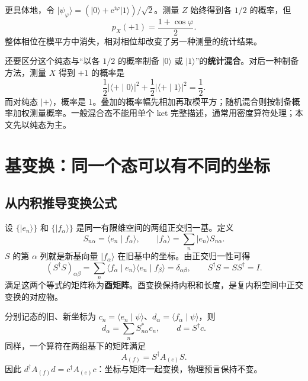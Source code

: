 \documentclass[a4paper,11pt]{article}
\numberwithin{equation}{section}
\newcommand{\ii}{\mathrm{i}}
\newcommand{\ee}{\mathrm{e}}
\newcommand{\ket}[1]{\lvert #1\rangle}
\newcommand{\braket}[2]{\langle #1\mid #2\rangle}
\newcommand{\abs}[1]{\lvert #1\rvert}
\begin{document}
更具体地，令 $\ket{\psi_\varphi}=(\ket{0}+\ee^{\ii\varphi}\ket{1})/\sqrt2$。测量 $Z$ 始终得到各 $1/2$ 的概率，但
\[
  p_X(+1)=\frac{1+\cos\varphi}{2}.
\]
整体相位在模平方中消失，相对相位却改变了另一种测量的统计结果。

还要区分这个纯态与“以各 $1/2$ 的概率制备 $\ket{0}$ 或 $\ket{1}$”的\textbf{统计混合}。对后一种制备方法，测量 $X$ 得到 $+1$ 的概率是
\[
  \frac12\abs{\braket{+}{0}}^2+
  \frac12\abs{\braket{+}{1}}^2=\frac12.
\]
而对纯态 $\ket{+}$，概率是 $1$。叠加的概率幅先相加再取模平方；随机混合则按制备概率加权测量概率。一般混合态不能用单个 ket 完整描述，通常用密度算符处理；本文先以纯态为主。

\section{基变换：同一个态可以有不同的坐标}
\subsection{从内积推导变换公式}
设 $\{\ket{e_n}\}$ 和 $\{\ket{f_\alpha}\}$ 是同一有限维空间的两组正交归一基。定义
\begin{equation}
  S_{n\alpha}=\braket{e_n}{f_\alpha},\qquad
  \ket{f_\alpha}=\sum_n\ket{e_n}S_{n\alpha}.
\end{equation}
$S$ 的第 $\alpha$ 列就是新基向量 $\ket{f_\alpha}$ 在旧基中的坐标。由正交归一性可得
\begin{equation}
  (S^\dagger S)_{\alpha\beta}
  =\sum_n\braket{f_\alpha}{e_n}\braket{e_n}{f_\beta}
  =\delta_{\alpha\beta},\qquad S^\dagger S=SS^\dagger=I.
\end{equation}
满足这两个等式的矩阵称为\textbf{酉矩阵}。酉变换保持内积和长度，是复内积空间中正交变换的对应物。

分别记态的旧、新坐标为 $c_n=\braket{e_n}{\psi}$、$d_\alpha=\braket{f_\alpha}{\psi}$，则
\begin{equation}\label{eq:changebasis}
  d_\alpha=\sum_n S_{n\alpha}^*c_n,
  \qquad \boxed{d=S^\dagger c.}
\end{equation}
同样，一个算符在两组基下的矩阵满足
\begin{equation}\label{eq:opchange}
  \boxed{A_{(f)}=S^\dagger A_{(e)}S.}
\end{equation}
因此 $d^\dagger A_{(f)}d=c^\dagger A_{(e)}c$：坐标与矩阵一起变换，物理预言保持不变。
\end{document}
